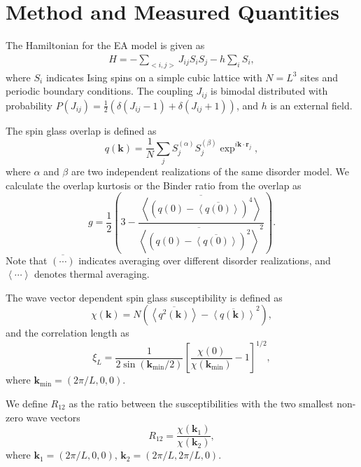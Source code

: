 \documentclass[aps,prb,twocolumn,showpacs,superscriptaddress]{revtex4}
\renewcommand{\vec}[1]{\mathbf{#1}}
\begin{document}
\section{Method and Measured Quantities} 
The Hamiltonian for the EA model is given as
\begin{eqnarray}
H=-\sum_{<i,j>} J_{ij} S_{i}S_{j}-h\sum_{i}S_{i},
\label{Hamiltonian}
\end{eqnarray}
where $S_i$ indicates Ising spins on a simple cubic lattice with $N=L^3$ sites and periodic boundary conditions. 
The coupling $J_{ij}$ is bimodal distributed with probability %
$P(J_{ij}) = \frac{1}{2}(\delta(J_{ij}-1) + \delta(J_{ij}+1))$, and $h$ is an external field.

The spin glass overlap is defined as 
\begin{equation}
  \label{eq:overlap}
  q(\vec{k})=\frac{1}{N}\sum_{j}S_j^{(\alpha)} S_j^{(\beta)}\exp^{i\vec{k} \cdot \vec{r}_j},
\end{equation}
where $\alpha$ and $\beta$ are two independent realizations of the same disorder model.
We calculate the overlap kurtosis or the Binder ratio from the overlap as \cite{Ciria-etal-1993,Marinari-etal-1998}
\begin{equation}
  \label{eq:binder}
  g=\frac{1}{2}\left(3-\frac{\overline{\left<\left(q(0)-\overline{\left<q(0)\right>}\right)^4\right>}}{\overline{\left<\left(q(0)-\overline{\left<q(0)\right>}\right)^2\right>}^2}\right).
\end{equation}
Note that $\overline{(\cdots)}$ indicates averaging over different disorder realizations,
and $\left<\cdots\right>$ denotes thermal averaging.


The wave vector dependent spin glass susceptibility is defined as \cite{Marinari-etal-1998}
\begin{equation}
  \label{eq:chi}
  \chi(\vec{k})= N(\overline{\left<q^2(\vec{k})\right>}-\overline{\left<q(\vec{k})\right>}^2),
\end{equation}
and the correlation length as 
\begin{equation}
  \label{eq:corr}
  \xi_L=\frac{1}{2\sin(\vec{k}_{\mathrm{min}}/2)}\left[\frac{\chi(0)}{\chi(\vec{k}_{\mathrm{min}})}-1\right]^{1/2},
\label{eq:corrlength}
\end{equation}
where $\vec{k}_{\mathrm{min}}=(2\pi/L,0,0)$. 

We define $R_{12}$ as the ratio between the susceptibilities with the two smallest non-zero wave 
vectors \cite{Banos-2012}
\begin{equation}
  \label{eq:r12}
  R_{12}=\frac{\chi(\vec{k}_1)}{\chi(\vec{k}_2)},
\end{equation}
where $\vec{k}_1=(2\pi/L,0,0)$, $\vec{k}_2=(2\pi/L,2\pi/L,0)$.
\end{document}
